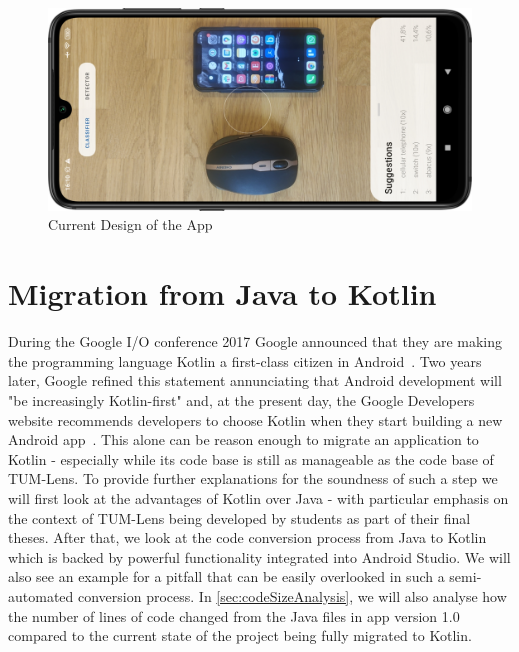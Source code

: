 \documentclass[
			   fontsize=11pt,
               paper=a4,
               bibliography=totoc,
               idxtotoc,
               headsepline,
               footsepline,
               footinclude=false,
               BCOR=12mm,
               DIV=13,
               openany,   %
               ]
               {scrbook}
\begin{document}
\bigskip

\begin{figure}[H]
	\centering
	\includegraphics[width=\textwidth]{figures/app_class_new_rot.png}
	\caption[Current Design of the App]{Current Design of the App}
	\label{fig:designUpdate}
\end{figure}

\chapter{Migration from Java to Kotlin}

During the Google I/O conference 2017 Google announced that they are making the programming language Kotlin a first-class citizen in Android~\cite{googleIO17}. Two years later, Google refined this statement annunciating that Android development will "be increasingly Kotlin-first" and, at the present day, the Google Developers website recommends developers to choose Kotlin when they start building a new Android app~\cite{kotlinFirst}. This alone can be reason enough to migrate an application to Kotlin - especially while its code base is still as manageable as the code base of TUM-Lens. To provide further explanations for the soundness of such a step we will first look at the advantages of Kotlin over Java - with particular emphasis on the context of TUM-Lens being developed by students as part of their final theses. After that, we look at the code conversion process from Java to Kotlin which is backed by powerful functionality integrated into Android Studio. We will also see an example for a pitfall that can be easily overlooked in such a semi-automated conversion process. In \autoref{sec:codeSizeAnalysis}, we will also analyse how the number of lines of code changed from the Java files in app version 1.0 compared to the current state of the project being fully migrated to Kotlin.
\end{document}

